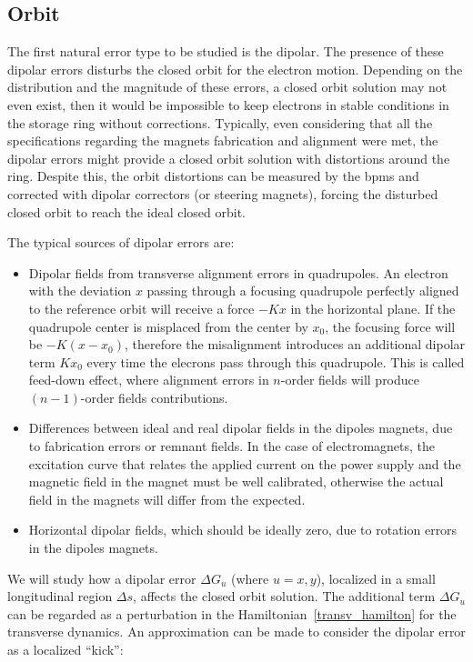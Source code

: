 \subsection{Orbit}\label{subset:orbit}

The first natural error type to be studied is the dipolar. The presence of these dipolar errors disturbs the closed orbit for the electron motion. Depending on the distribution and the magnitude of these errors, a closed orbit solution may not even exist, then it would be impossible to keep electrons in stable conditions in the storage ring without corrections. Typically, even considering that all the specifications regarding the magnets fabrication and alignment were met, the dipolar errors might provide a closed orbit solution with distortions around the ring. Despite this, the orbit distortions can be measured by the \gls{bpm}s and corrected with dipolar correctors (or steering magnets), forcing the disturbed closed orbit to reach the ideal closed orbit.

The typical sources of dipolar errors are:

\begin{itemize}
    \item Dipolar fields from transverse alignment errors in quadrupoles. An electron with the deviation $x$ passing through a focusing quadrupole perfectly aligned to the reference orbit will receive a force $-Kx$ in the horizontal plane. If the quadrupole center is misplaced from the center by $x_0$, the focusing force will be $-K(x - x_0)$, therefore the misalignment introduces an additional dipolar term $K x_0$ every time the elecrons pass through this quadrupole. This is called feed-down effect, where alignment errors in $n$-order fields will produce $(n-1)$-order fields contributions.
    
    \item Differences between ideal and real dipolar fields in the dipoles magnets, due to fabrication errors or remnant fields. In the case of electromagnets, the excitation curve that relates the applied current on the power supply and the magnetic field in the magnet must be well calibrated, otherwise the actual field in the magnets will differ from the expected. 
    
    \item Horizontal dipolar fields, which should be ideally zero, due to rotation errors in the dipoles magnets.
\end{itemize}

We will study how a dipolar error $\Delta G_u$ (where $u=x, y$), localized in a small longitudinal region $\Delta s$, affects the closed orbit solution. The additional term $\Delta G_u$ can be regarded as a perturbation in the Hamiltonian~\eqref{transv_hamilton} for the transverse dynamics. An approximation can be made to consider the dipolar error as a localized ``kick'': 

